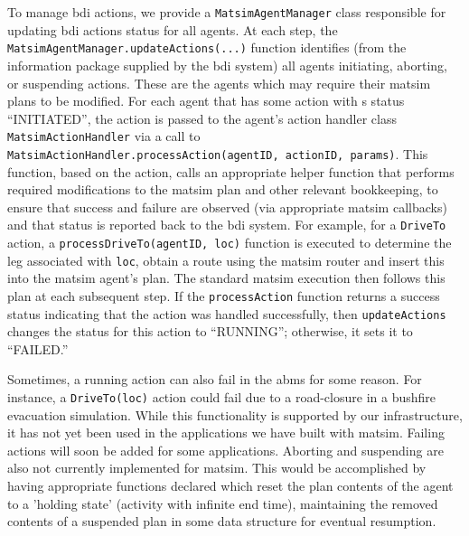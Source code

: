 To manage \gls{bdi} actions, we provide a \lstinline{MatsimAgentManager} class
responsible for updating \gls{bdi} actions status for all agents.
At each step, the \lstinline{MatsimAgentManager.updateActions(...)} function
  identifies (from the information package supplied by the \gls{bdi} system)
  all agents initiating, aborting, or suspending
  actions. These are the agents which may require their \gls{matsim} plans
  to be modified.  For each agent that has some action with s   
  status ``INITIATED'', the action is passed to the agent's action handler 
  class \lstinline{MatsimActionHandler} via a call to
  \lstinline{MatsimActionHandler.processAction(agentID, actionID, params)}.
  This function, based on the action, calls an appropriate helper
  function that performs required modifications to the \gls{matsim} plan and other
  relevant bookkeeping, to ensure that success and failure are observed
  (via appropriate \gls{matsim} callbacks) and that status is reported back
  to the \gls{bdi} system.  
%
For example, for a \lstinline{DriveTo} action, a
\lstinline{processDriveTo(agentID, loc)} function is executed to determine the leg 
associated with \lstinline{loc}, obtain a route using the \gls{matsim} router and
insert this into the \gls{matsim} agent's plan. The standard \gls{matsim} execution then
follows this plan at each subsequent step. 
If the \lstinline{processAction} function returns a success
  status indicating that the action was handled successfully, then
  \lstinline{updateActions} changes the status for this
  action to ``RUNNING''; otherwise, it sets it to ``FAILED.''   
  
 Sometimes, a running
  action can also  fail in the \gls{abms} for some reason. For
  instance, a \lstinline{DriveTo(loc)} action could fail due to a
  road-closure in a bushfire evacuation simulation.
  While this
  functionality is supported by our infrastructure, it has not yet been used
  in the applications we have built with \gls{matsim}. Failing actions will
  soon be added for some applications.
  Aborting and suspending are also not currently
  implemented for \gls{matsim}.  This would be accomplished by having appropriate
  functions declared which reset the plan contents of the agent to 
  a 'holding state' (activity with infinite end time),
  maintaining the removed contents of a suspended plan in some data
  structure for eventual resumption.
  
